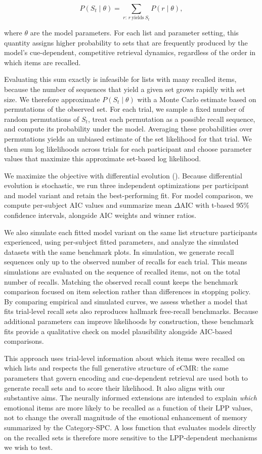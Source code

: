 \documentclass[
  man,
  longtable,
  nolmodern,
  notxfonts,
  notimes,
  draftfirst,
  colorlinks=true,linkcolor=blue,citecolor=blue,urlcolor=blue]{apa7}
\begin{document}
\[
P(S_t \mid \theta) = \sum_{r:\, r\ \text{yields}\ S_t} P(r \mid \theta),
\]

where \(\theta\) are the model parameters. For each list and parameter
setting, this quantity assigns higher probability to sets that are
frequently produced by the model's cue-dependent, competitive retrieval
dynamics, regardless of the order in which items are recalled.

Evaluating this sum exactly is infeasible for lists with many recalled
items, because the number of sequences that yield a given set grows
rapidly with set size. We therefore approximate \(P(S_t \mid \theta)\)
with a Monte Carlo estimate based on permutations of the observed set.
For each trial, we sample a fixed number of random permutations of
\(S_t\), treat each permutation as a possible recall sequence, and
compute its probability under the model. Averaging these probabilities
over permutations yields an unbiased estimate of the set likelihood for
that trial. We then sum log likelihoods across trials for each
participant and choose parameter values that maximize this approximate
set-based log likelihood.

We maximize the objective with differential evolution
(). Because
differential evolution is stochastic, we run three independent
optimizations per participant and model variant and retain the
best-performing fit. For model comparison, we compute per-subject AIC
values and summarize mean \(\Delta\)AIC with t-based 95\% confidence
intervals, alongside AIC weights and winner ratios.

We also simulate each fitted model variant on the same list structure
participants experienced, using per-subject fitted parameters, and
analyze the simulated datasets with the same benchmark plots. In
simulation, we generate recall sequences only up to the observed number
of recalls for each trial. This means simulations are evaluated on the
sequence of recalled items, not on the total number of recalls. Matching
the observed recall count keeps the benchmark comparison focused on item
selection rather than differences in stopping policy. By comparing
empirical and simulated curves, we assess whether a model that fits
trial-level recall sets also reproduces hallmark free-recall benchmarks.
Because additional parameters can improve likelihoods by construction,
these benchmark fits provide a qualitative check on model plausibility
alongside AIC-based comparisons.

This approach uses trial-level information about which items were
recalled on which lists and respects the full generative structure of
eCMR: the same parameters that govern encoding and cue-dependent
retrieval are used both to generate recall sets and to score their
likelihood. It also aligns with our substantive aims. The neurally
informed extensions are intended to explain \emph{which} emotional items
are more likely to be recalled as a function of their LPP values, not to
change the overall magnitude of the emotional enhancement of memory
summarized by the Category-SPC. A loss function that evaluates models
directly on the recalled sets is therefore more sensitive to the
LPP-dependent mechanisms we wish to test.
\end{document}
